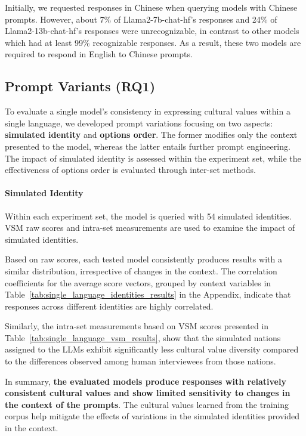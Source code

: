 \documentclass[11pt]{article}
\begin{document}
Initially, we requested responses in Chinese when querying models with Chinese prompts. However, about 7\% of Llama2-7b-chat-hf's responses and 24\% of Llama2-13b-chat-hf's responses were unrecognizable, in contrast to other models which had at least 99\% recognizable responses. As a result, these two models are required to respond in English to Chinese prompts.

\subsection{Prompt Variants (RQ1)}

To evaluate a single model's consistency in expressing cultural values within a single language, we developed prompt variations focusing on two aspects: \textbf{simulated identity} and \textbf{options order}. The former modifies only the context presented to the model, whereas the latter entails further prompt engineering. The impact of simulated identity is assessed within the experiment set, while the effectiveness of options order is evaluated through inter-set methods.

\paragraph{Simulated Identity}
Within each experiment set, the model is queried with 54 simulated identities. VSM raw scores and intra-set measurements are used to examine the impact of simulated identities.

Based on raw scores, each tested model consistently produces results with a similar distribution, irrespective of changes in the context. The correlation coefficients for the average score vectors, grouped by context variables in Table~\ref{tab:single_language_identities_results} in the Appendix, indicate that responses across different identities are highly correlated.

Similarly, the intra-set measurements based on VSM scores presented in Table~\ref{tab:single_language_vsm_results}, show that the simulated nations assigned to the LLMs exhibit significantly less cultural value diversity compared to the differences observed among human interviewees from those nations.

In summary, \textbf{the evaluated models produce responses with relatively consistent cultural values and show limited sensitivity to changes in the context of the prompts}. The cultural values learned from the training corpus help mitigate the effects of variations in the simulated identities provided in the context.
\end{document}
